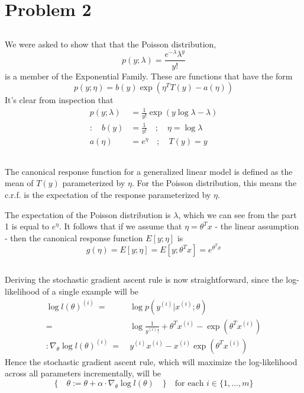 \documentclass[11pt]{article} %
\begin{document}
\section{Problem 2}

\subsection{}
We were asked to show that that the Poisson distribution,
\[
	p(y; \lambda) = \frac{e^{-\lambda}\lambda^y}{y!}
\]
is a member of the Exponential Family. These are functions that have the form
\[
	p(y; \eta) = b(y)\exp{(\eta^T  T(y) - a(\eta))}
\]
It's clear from inspection that
\begin{equation}
\begin{split}
	p(y; \lambda) &= \frac{1}{y!} \exp{(y\log\lambda - \lambda)} \\
	: \quad b(y) &= \frac{1}{y!} \quad ; \quad \eta = \log\lambda \\
	a(\eta) &= e^\eta \quad ; \quad T(y) = y
\end{split}
\end{equation}

\subsection{}
The canonical response function for a generalized linear model is defined as the mean of $T(y)$ parameterized by $\eta$. For the Poisson distribution, this means the c.r.f. is the expectation of the response parameterized by $\eta$. \par
 The expectation of the Poisson distribution is $\lambda$, which we can see from the part 1 is equal to $e^{\eta}$. It follows that if we assume that $\eta = \theta^Tx$ - the linear assumption - then the canonical response function $E[y ; \eta]$ is
 \[
 	 g(\eta)  = E[y; \eta] = E[y; \theta^T x] = e^{\theta^T x}
 \]
 
 \subsection{}
 Deriving the stochastic gradient ascent rule is now straightforward, since the log-likelihood of a single example will be
 \begin{equation}
 \begin{split}
 	 \log l(\theta)^{(i)} \ =& \ \log p(y^{(i)}|x^{(i)}; \theta) \\
 	 =&  \ \log\frac{1}{y^{(i)}!} + \theta^T x^{(i)} - \exp{(\theta^T x^{(i)})} \\
 	 : \nabla_{\theta}\log l(\theta)^{(i)} \ =& \ y^{(i)}x^{(i)} - x^{(i)}\exp(\theta^Tx^{(i)})
\end{split}
\end{equation}
Hence the stochastic gradient ascent rule, which will maximize the log-likelihood across all parameters incrementally, will be
\[
	\{ \quad \theta := \theta + \alpha \cdot \nabla_{\theta}\log l(\theta) \quad \} \quad \text{for each } i \in \{1, ..., m\}
\]
\end{document}
